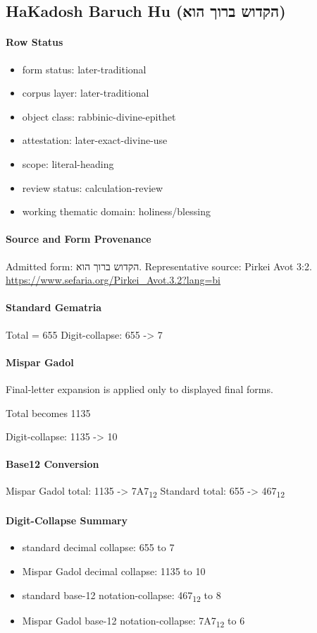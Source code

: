 \subsection{HaKadosh Baruch Hu (הקדוש ברוך הוא)}
\paragraph{Row Status}
\begin{itemize}
\item form status: later-traditional
\item corpus layer: later-traditional
\item object class: rabbinic-divine-epithet
\item attestation: later-exact-divine-use
\item scope: literal-heading
\item review status: calculation-review
\item working thematic domain: holiness/blessing
\end{itemize}
\paragraph{Source and Form Provenance}
Admitted form: הקדוש ברוך הוא.
Representative source: Pirkei Avot 3:2.
\url{https://www.sefaria.org/Pirkei_Avot.3.2?lang=bi}
\paragraph{Standard Gematria}
Total = 655
Digit-collapse: 655 -> 7
\paragraph{Mispar Gadol}
Final-letter expansion is applied only to displayed final forms.

Total becomes 1135

Digit-collapse: 1135 -> 10
\paragraph{Base12 Conversion}
Mispar Gadol total: 1135 -> 7A7\textsubscript{12}
Standard total: 655 -> 467\textsubscript{12}
\paragraph{Digit-Collapse Summary}
\begin{itemize}
\item standard decimal collapse: 655 to 7
\item Mispar Gadol decimal collapse: 1135 to 10
\item standard base-12 notation-collapse: 467\textsubscript{12} to 8
\item Mispar Gadol base-12 notation-collapse: 7A7\textsubscript{12} to 6
\end{itemize}
